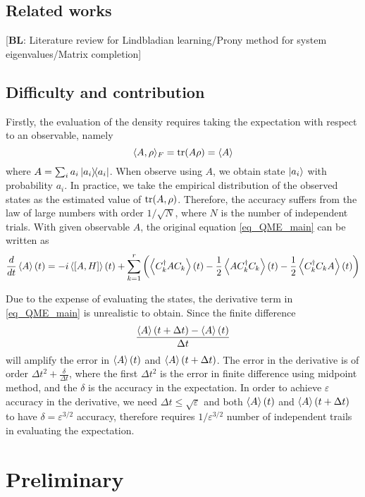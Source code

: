\documentclass[10pt]{article}  %
\theoremstyle{plain}
\numberwithin{equation}{section}
\newcommand{\innerp}[1]{\langle{#1}\rangle}
\newcommand{\bl}[1]{{\color{magenta} [\textbf{BL}: #1]}}
\begin{document}
\subsection*{Related works} 
\bl{Literature review for Lindbladian learning/Prony method for system eigenvalues/Matrix completion}

\subsection*{Difficulty and contribution} 
Firstly, the evaluation of the density requires taking the expectation with respect to an observable, namely
$$ \innerp{A, \rho}_F = \tr(A \rho) = \expval{A}$$
where $A = \sum_i a_i \ketbra{a_i}{a_i}$. When observe using $A$, we obtain state $\ket{a_i}$ with probability $a_i$. In practice, we take the empirical distribution of the observed states as the estimated value of $\tr(A, \rho)$. Therefore, the accuracy suffers from the law of large numbers with order $1/\sqrt{N}$, where $N$ is the number of independent trials. With given observable $A$, the original equation \eqref{eq_QME_main} can be written as 
\begin{equation}
	\frac{d}{dt} \expval{A}(t) = -i\expval{[A, H]}(t) + \sum_{k = 1}^r \left(\expval{C_k^\dagger A C_k}(t) - \frac{1}{2} \expval{A C_k^\dagger C_k} (t) - \frac{1}{2} \expval{C_k^\dagger C_k A}(t) \right)
\end{equation}



Due to the expense of evaluating the states, the derivative term in \eqref{eq_QME_main} is unrealistic to obtain. Since the finite difference 
$$ \frac{\expval{A}(t + \Delta t) - \expval{A}(t)}{\Delta t} $$ 
will amplify the error in $\expval{A}(t)$ and $\expval{A}(t + \Delta t)$. The error in the derivative is of order $\Delta t^2 + \frac{\delta}{\Delta t}$, where the first $\Delta t^2 $ is the error in finite difference using midpoint method, and the $\delta$ is the accuracy in the expectation. In order to achieve $\varepsilon$ accuracy in the derivative, we need $\Delta t \leq \sqrt{\varepsilon}$ and both $\expval{A}(t)$ and $\expval{A}(t + \Delta t)$ to have $\delta = \varepsilon^{3/2}$ accuracy, therefore requires $1/\varepsilon^{3/2}$ number of independent trails in evaluating the expectation.

\section{Preliminary}
\end{document}
